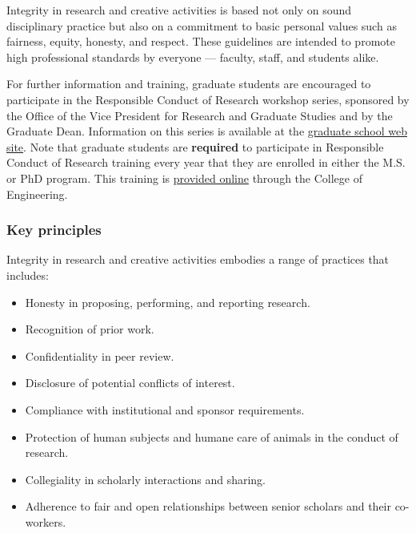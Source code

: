 Integrity in research and creative activities is based not only on
sound disciplinary practice but also on a commitment to basic personal
values such as fairness, equity, honesty, and respect. These
guidelines are intended to promote high professional standards by
everyone — faculty, staff, and students alike.
  
For further information and training, graduate students are encouraged
to participate in the Responsible Conduct of Research workshop series,
sponsored by the Office of the Vice President for Research and
Graduate Studies and by the Graduate Dean. Information on this series
is available at the \href{http://www.msu.edu/user/gradschl/}{graduate
  school web site}.  Note that graduate students are \textbf{required} to participate in
 Responsible Conduct of Research training every year that they are
 enrolled in either the M.S. or PhD program.  This training is
 \href{https://www.egr.msu.edu/academics/graduate/rcr}{provided
   online} through the College of Engineering.


\subsubsection{Key principles}

Integrity in research and creative activities embodies a range of practices that includes: 

\begin{itemize}
\item Honesty in proposing, performing, and reporting research. 

\item Recognition of prior work. 

\item Confidentiality in peer review. 

\item Disclosure of potential conflicts of interest. 

\item Compliance with institutional and sponsor requirements. 

\item Protection of human subjects and humane care of animals in the
  conduct of research. 

\item Collegiality in scholarly interactions and sharing.  

\item Adherence to fair and open relationships between senior
scholars and their co-workers. 

\end{itemize}

